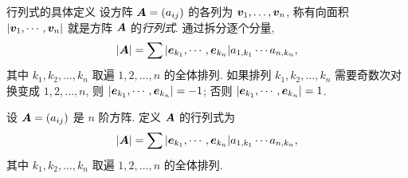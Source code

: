 

\begin{frame}{行列式的具体定义\noexer}
	\onslide<+->
	设方阵 ${\boldsymbol{A}}=(a_{ij})$ 的各列为 ${\boldsymbol{v}}_1,\dots,{\boldsymbol{v}}_n$,
	\onslide<+->
	称有向面积 $|{\boldsymbol{v}}_1,\cdots,{\boldsymbol{v}}_n|$ 就是方阵 ${\boldsymbol{A}}$ 的\emph{行列式}.
	\onslide<+->
	通过拆分逐个分量,
	\[|{\boldsymbol{A}}|=\sum |{\boldsymbol{e}}_{k_1},\cdots,{\boldsymbol{e}}_{k_n}| a_{1,k_1}\cdots a_{n,k_n}, \]
	其中 $k_1,k_2,\dots,k_n$ 取遍 $1,2,\dots,n$ 的全体排列.
	\onslide<+->
	如果排列 $k_1,k_2,\dots,k_n$ 需要奇数次对换变成 $1,2,\dots,n$, 则 
	$|{\boldsymbol{e}}_{k_1},\cdots,{\boldsymbol{e}}_{k_n}|=-1$; 否则 $|{\boldsymbol{e}}_{k_1},\cdots,{\boldsymbol{e}}_{k_n}|=1$.
	\onslide<+->
	\begin{definition}[行列式]
		设 ${\boldsymbol{A}}=(a_{ij})$ 是 $n$ 阶方阵.
		定义 ${\boldsymbol{A}}$ 的行列式为
		\[|{\boldsymbol{A}}|=\sum |{\boldsymbol{e}}_{k_1},\cdots,{\boldsymbol{e}}_{k_n}| a_{1,k_1}\cdots a_{n,k_n},\]
		其中 $k_1,k_2,\dots,k_n$ 取遍 $1,2,\dots,n$ 的全体排列.
	\end{definition}
\end{frame}


